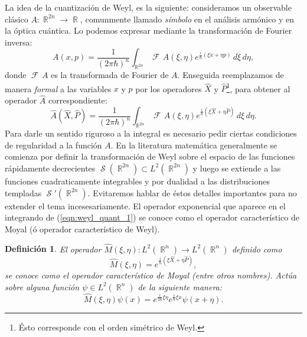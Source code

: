 \documentclass[a4paper,11pt]{report}
\DeclareMathOperator{\R}{\mathbb{R}}
\DeclareMathOperator{\Sz}{\mathcal S}
\DeclareMathOperator{\Fr}{\mathcal{F}\!}
\newtheorem{definition}{Definición}
\begin{document}
  La idea de la cuantización de Weyl, es la siguiente:
  consideramos un observable clásico $A : \R^{2n} \to \R$,
  comunmente llamado \textit{símbolo} en el análisis
  armónico y en la óptica cuántica. Lo podemos expresar
  mediante la transformación de Fourier inversa:
  \begin{equation}
    A(x,p)
    = \frac{1}{(2\pi\hbar)^{n}} \int_{\R^{2n}} \Fr A(\xi,
    \eta) e^{\frac{i}{\hbar} \left( \xi x + \eta p\right) }
    \, d\xi \, d\eta,
  \end{equation}
  donde $\Fr A$ es la transformada de Fourier de $A$.
  Enseguida reemplazamos de manera \textit{formal} a las
  variables $x$ y $p$ por los operadores $\hat{X}$ y
  $\hat{P}$\footnote{Ésto corresponde con el orden simétrico
    de Weyl.}, para obtener al operador $\hat{A}$
  correspondiente:
  \begin{equation}
    \label{eqn:weyl_quant_1}
    \hat{A}(\hat{X},\hat{P})
    = \frac{1}{(2\pi\hbar)^{n}} \int_{\R^{2n}} \Fr
    A(\xi,\eta) e^{\frac{i}{\hbar} \left( \xi \hat{X} + \eta
    \hat{P}\right) } \, d\xi \, d\eta.
  \end{equation}
  Para darle un sentido riguroso a la integral es necesario
  pedir ciertas condiciones de regularidad a la función $A$.
  En la literatura matemática generalmente se comienza por
  definir la transformación de Weyl sobre el espacio de las
  funciones rápidamente decrecientes $\Sz(\R^{2n}) \subset
  L^2(\R^{2n})$ y luego se extiende a las funciones
  cuadraticamente integrables y por dualidad a las
  distribuciones templadas $\Sz'(\R^{2n})$. Evitaremos
  hablar de éstos detalles importantes para no extender el
  tema incesesariamente. El operador exponencial que
  aparece en el integrando de (\ref{eqn:weyl_quant_1}) se
  conoce como el operador característico de Moyal (ó
  operador característico de Weyl).
  \begin{definition}
    El operador $\hat{M}(\xi, \eta) : L^2(\R^{n}) \to
    L^2(\R^{n})$ definido como
    \begin{equation*}
      \hat{M}(\xi,\eta)
      = e^{\frac{i}{\hbar} \left( \xi \hat{X} + \eta \hat{P}
      \right) },
    \end{equation*} 
    se conoce como el operador característico de Moyal
    (entre otros nombres). Actúa sobre alguna función $\psi
    \in L^2(\R^{n})$ de la siguiente manera:
    \begin{equation}
      \hat{M}(\xi,\eta)\psi(x)
      = e^{\frac{i}{2\hbar} \xi\eta} e^{\frac{i}{\hbar} \xi
      x} \psi(x + \eta).
    \end{equation}
  \end{definition}
\end{document}
